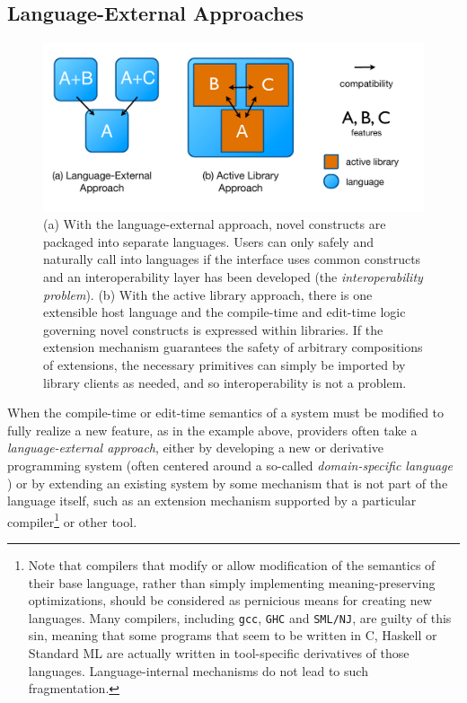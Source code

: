 \subsection{Language-External Approaches}
\begin{figure}
\begin{center}
\includegraphics[scale=0.45]{approaches.pdf}
\end{center}
\vspace{-20px}
\caption{\small (a) With the language-external approach, novel constructs are packaged into separate languages. Users can only safely and naturally call into languages if the interface uses common constructs and an interoperability layer has been developed (the \emph{interoperability problem}). (b) With the active library approach, there is one extensible host language and the compile-time and edit-time logic governing novel constructs is expressed within libraries. If the extension mechanism guarantees the safety of arbitrary compositions of extensions, the necessary primitives can simply be imported by library clients as needed, and so interoperability is not a problem.}
\label{approaches}
\end{figure}

When the compile-time or edit-time semantics of a system must be modified to fully realize a new feature, as in the example above, providers often take a \emph{language-external approach}, either by developing a new or derivative programming system (often centered around a so-called \emph{domain-specific language} \cite{dsl}) or by extending an existing system by some mechanism that is not part of the language itself, such as an extension mechanism supported by a {particular} compiler\footnote{Note that compilers that modify or allow modification of  the semantics of their base language, rather than simply implementing meaning-preserving optimizations, should be considered as pernicious means for creating new languages. Many compilers, including \texttt{gcc}, \texttt{GHC} and \texttt{SML/NJ}, are guilty of this sin, meaning that some programs that seem to be written in C, Haskell or Standard ML are actually written in tool-specific derivatives of those languages. Language-internal mechanisms do not lead to such fragmentation.} or other tool. %

